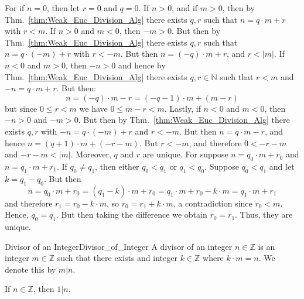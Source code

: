     \begin{bproof}
        For if $n=0$, then let $r=0$ and $q=0$. If $n>0$, and if $m>0$,
        then by Thm.~\ref{thm:Weak_Euc_Division_Alg} there exists
        $q,r$ such that $n=q\cdot{m}+r$ with $r<m$. If $n>0$ and $m<0$,
        then $\minus{m}>0$. But then by
        Thm.~\ref{thm:Weak_Euc_Division_Alg} there exists $q,r$ such
        that $n=q\cdot(\minus{m})+r$ with $r<\minus{m}$. But then
        $n=(\minus{q})\cdot{m}+r$, and $r<|m|$. If $n<0$ and $m>0$,
        then $\minus{n}>0$ and hence by
        Thm.~\ref{thm:Weak_Euc_Division_Alg} there exists
        $q,r\in\mathbb{N}$ such that $r<m$ and $\minus{n}=q\cdot{m}+r$.
        But then:
        \begin{equation}
            n=(\minus{q})\cdot{m}-r=(\minus{q}-1)\cdot{m}+(m-r)
        \end{equation}
        but since $0\leq{r}<m$ we have $0\leq{m}-r<m$. Lastly, if $n<0$
        and $m<0$, then $\minus{n}>0$ and $\minus{m}>0$. But then by
        Thm.~\ref{thm:Weak_Euc_Division_Alg} there exists $q,r$ with
        $\minus{n}=q\cdot(\minus{m})+r$ and $r<\minus{m}$. But then
        $n=q\cdot{m}-r$, and hence $n=(q+1)\cdot{m}+(\minus{r}-m)$. But 
        $r<\minus{m}$, and therefore $0<\minus{r}-m$ and
        $\minus{r}-m<|m|$. Moreover, $q$ and $r$ are unique. For suppose
        $n=q_{0}\cdot{m}+r_{0}$ and $n=q_{1}\cdot{m}+r_{1}$. If
        $q_{0}\ne{q}_{1}$, then either $q_{0}<q_{1}$ or $q_{1}<q_{0}$.
        Suppose $q_{0}<q_{1}$ and let $k=q_{1}-q_{0}$. But then
        \begin{equation}
            n=q_{0}\cdot{m}+r_{0}=(q_{1}-k)\cdot{m}+r_{0}
                =q_{1}\cdot{m}+r_{0}-k\cdot{m}
                =q_{1}\cdot{m}+r_{1}
        \end{equation}
        and therefore $r_{1}=r_{0}-k\cdot{m}$, so
        $r_{0}=r_{1}+k\cdot{m}$, a contradiction since $r_{0}<m$. Hence,
        $q_{0}=q_{1}$. But then taking the difference we obtain
        $r_{0}=r_{1}$. Thus, they are unique.
    \end{bproof}
    \begin{fdefinition}{Divisor of an Integer}{Divisor_of_Integer}
        A divisor of an integer $n\in\mathbb{Z}$ is an integer
        $m\in\mathbb{Z}$ such that there exists and integer
        $k\in\mathbb{Z}$ where $k\cdot{m}=n$. We denote this by $m|n$.
    \end{fdefinition}
    \begin{theorem}
        \label{thm:One_is_Divisor}%
        If $n\in\mathbb{Z}$, then $1|n$.
    \end{theorem}

